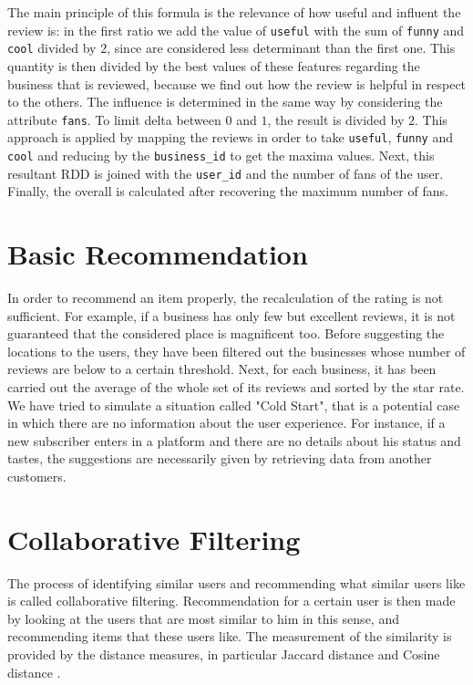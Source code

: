 \documentclass{article}
\begin{document}
The main principle of this formula is the relevance of how useful and influent the review is: in the first ratio we add the value of \texttt{useful} with the sum of \texttt{funny} and \texttt{cool} divided by $2$, since are considered less determinant than the first one. This quantity is then divided by the best values of these features regarding the business that is reviewed, because we find out how the review is helpful in respect to the others. The influence is determined in the same way by considering the attribute \texttt{fans}. To limit delta between $0$ and $1$, the result is divided by $2$.
This approach is applied by mapping the reviews in order to take  \texttt{useful}, \texttt{funny} and \texttt{cool} and reducing by the \texttt{business\_id} to get the maxima values. Next, this resultant RDD is joined with the \texttt{user\_id} and the number of fans of the user. Finally, the overall is calculated after recovering the maximum number of fans.

\section{Basic Recommendation}
\label{sec:basicrec}
In order to recommend an item properly, the recalculation of the rating is not sufficient. For example, if a business has only few but excellent reviews, it is not guaranteed that the considered place is magnificent too. Before suggesting the locations to the users, they have been filtered out the businesses whose number of reviews are below to a certain threshold. Next, for each business, it has been carried out the average of the whole set of its reviews and sorted by the star rate. We have tried to simulate a situation called "Cold Start", that is a potential case in which there are no information about the user experience. For instance, if a new subscriber enters in a platform and there are no details about his status and tastes, the suggestions are necessarily given by retrieving data from another customers. 

\section{Collaborative Filtering}
The process of identifying similar users and recommending what similar users like is called collaborative filtering. Recommendation for a certain user is then made by looking at the users that are most similar to him in this sense, and recommending items that these users like. The measurement of the similarity is provided by the distance measures, in particular Jaccard distance and Cosine distance \cite{leskovec2020mining}. 
\end{document}
